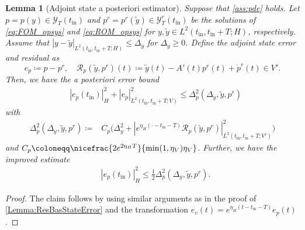 \documentclass{m2an}
\newcommand{\reduce}[1]{{{#1}^r}}
\newcommand{\tint}{t_{\mathrm{in}}}
\newcommand{\mY}{{\mathscr Y}}
\newcommand{\calR}{\mathcal{R}}
\newcommand{\Res}{\calR}%
\newcommand{\norm}[2]{\left|#1\right|_{#2}}
\newtheorem{lemma}[thrm]{Lemma}
\begin{document}
\begin{lemma}[Adjoint state a posteriori estimator]
    \label{lem:ResAdjest}
    Suppose that \cref{ass:pde} holds. Let $p=p(y)\in\mY_T(\tint)$ and $p^r=p^r(\tilde y)\in\mY^r_T(\tint)$ be the solutions of \eqref{eq:FOM_opsys} and \eqref{eq:ROM_opsys} for $y,\tilde y\in L^2(\tint,\tint+T;H)$, respectively. Assume that $\norm{y-\tilde y}{L^2(\tint,\tint+T;H)} \leq \Delta_y $
    for $\Delta_y\geq 0$. Define the adjoint state error and residual as
    \begin{equation*}
        e_p\coloneqq p-p^r, \quad \Res_p(\tilde y, p^r)(t)\coloneqq\tilde y(t)-A'(t)p^r(t)+\dot p^r(t)\in V'.
    \end{equation*}
    Then, we have the \emph{a posteriori} error bound
    \begin{align}\label{eq:adjstate_apost_CHL2V}
        &\norm{e_p(\tint)}{H}^2+\norm{e_p}{L^2(\tint,\tint+T;V)}^2\leq \Delta_p^2(\Delta_y,\tilde y, p^r)
    \end{align}
    with
    \begin{align}\label{eq:adjstate_apost_CHL2V_struc}
        \Delta_{p}^2{(\Delta_y,\tilde y, p^r)}  \coloneqq & C_{p}\Big(\Delta_y^2 + \norm{e^{\eta_H (\cdot-\tint-T) }\Res_p(\tilde y, \reduce p)}{L^2(\tint,\tint+T;V')}^2\Big)
    \end{align}
    and $C_{p}\coloneqq\nicefrac{2e^{2\eta_H T}}{\min(1,\eta_V)\eta_V}$. Further, we have the improved estimate
    \begin{align}\label{eq:adjstate_apost_Ht}
        &\norm{e_p(\tint)}{H}^2\leq \tfrac{1}{2} \Delta_{p}^2 {(\Delta_y,\tilde y, p^r)}.%
    \end{align}
\end{lemma}
%
\begin{proof}
    The claim follows by using similar arguments as in the proof of \cref{Lemma:ResBasStateError} and the transformation $e_v(t)=e^{\eta_H(t-\tint-T)}e_p(t)$.
\end{proof}
%
\end{document}
